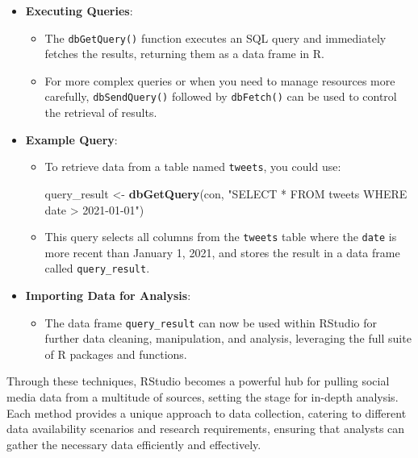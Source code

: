 \documentclass[
]{book}
\newenvironment{Shaded}{\begin{snugshade}}{\end{snugshade}}
\newcommand{\FunctionTok}[1]{\textcolor[rgb]{0.13,0.29,0.53}{\textbf{#1}}}
\newcommand{\NormalTok}[1]{#1}
\newcommand{\OtherTok}[1]{\textcolor[rgb]{0.56,0.35,0.01}{#1}}
\newcommand{\StringTok}[1]{\textcolor[rgb]{0.31,0.60,0.02}{#1}}
\providecommand{\tightlist}{%
  \setlength{\itemsep}{0pt}\setlength{\parskip}{0pt}}
\begin{document}
\begin{itemize}
\tightlist
\item
  \textbf{Executing Queries}:

  \begin{itemize}
  \tightlist
  \item
    The \texttt{dbGetQuery()} function executes an SQL query and immediately fetches the results, returning them as a data frame in R.
  \item
    For more complex queries or when you need to manage resources more carefully, \texttt{dbSendQuery()} followed by \texttt{dbFetch()} can be used to control the retrieval of results.
  \end{itemize}
\item
  \textbf{Example Query}:

  \begin{itemize}
  \item
    To retrieve data from a table named \texttt{tweets}, you could use:

\begin{Shaded}
\begin{Highlighting}[]
\NormalTok{query\_result }\OtherTok{\textless{}{-}} \FunctionTok{dbGetQuery}\NormalTok{(con, }\StringTok{"SELECT * FROM tweets WHERE date \textgreater{} \textquotesingle{}2021{-}01{-}01\textquotesingle{}"}\NormalTok{)}
\end{Highlighting}
\end{Shaded}
  \item
    This query selects all columns from the \texttt{tweets} table where the \texttt{date} is more recent than January 1, 2021, and stores the result in a data frame called \texttt{query\_result}.
  \end{itemize}
\item
  \textbf{Importing Data for Analysis}:

  \begin{itemize}
  \tightlist
  \item
    The data frame \texttt{query\_result} can now be used within RStudio for further data cleaning, manipulation, and analysis, leveraging the full suite of R packages and functions.
  \end{itemize}
\end{itemize}

Through these techniques, RStudio becomes a powerful hub for pulling social media data from a multitude of sources, setting the stage for in-depth analysis. Each method provides a unique approach to data collection, catering to different data availability scenarios and research requirements, ensuring that analysts can gather the necessary data efficiently and effectively.
\end{document}
